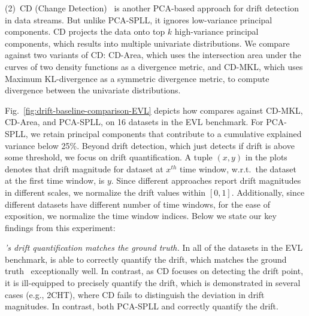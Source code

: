 \smallskip
 
(2)~CD (Change Detection)~\cite{DBLP:conf/kdd/QahtanAWZ15}
is another PCA-based approach for drift detection in data streams. But unlike
PCA-SPLL, it ignores low-variance principal components. CD projects the data
onto top $k$ high-variance principal components, which results into multiple
univariate distributions. We compare against two variants of CD: CD-Area, which
uses the intersection area under the curves of two density functions as a
divergence metric, and CD-MKL, which uses Maximum KL-divergence as a symmetric
divergence metric, to compute divergence between the univariate distributions.

\smallskip

 Fig.~\ref{fig:drift-baseline-comparison-EVL} depicts how \system
compares against CD-MKL, CD-Area, and PCA-SPLL, on 16 datasets in the
EVL benchmark. For PCA-SPLL, we retain principal components that contribute to
a cumulative explained variance below 25\%. Beyond drift detection, which just
detects if drift is above some threshold, we focus on drift
quantification. A tuple $(x,y)$ in the plots denotes that drift
magnitude for dataset at $x^{th}$ time window, w.r.t.\ the dataset at the first
time window, is $y$. Since different approaches report drift magnitudes in
different scales, we normalize the drift values within $[0, 1]$. Additionally,
since different datasets have different number of time windows,
for the ease of exposition, we normalize the time window indices. Below
we state our key findings from this experiment:


\smallskip 

 
 \emph{\system's drift quantification matches the ground truth.} In
all of the datasets in the EVL benchmark, \system is able to correctly quantify
the drift, which matches the ground truth~\cite{evlVideo} exceptionally well.
In contrast, as CD focuses on detecting the drift point, it is ill-equipped to
precisely quantify the drift, which is demonstrated in several cases (e.g.,
2CHT), where CD fails to distinguish the deviation in drift magnitudes. In
contrast, both PCA-SPLL and \system correctly quantify the drift.


